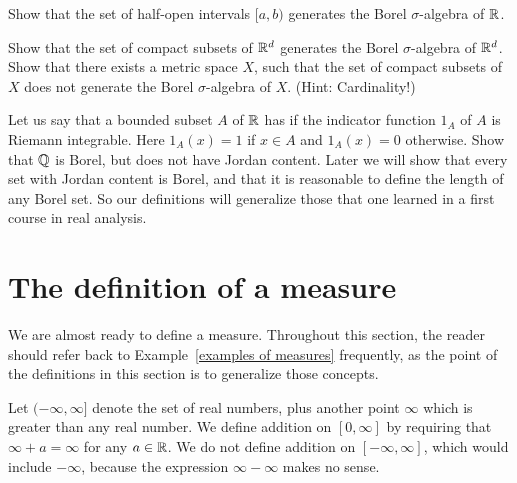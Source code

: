 \begin{exercise}\label{generators of Borel}
Show that the set of half-open intervals $[a, b)$ generates the Borel $\sigma$-algebra of $\mathbb{R}$.
\end{exercise}

\begin{exercise}
Show that the set of compact subsets of $\mathbb{R}^{d}$ generates the Borel $\sigma$-algebra of $\mathbb{R}^{d}$.
Show that there exists a metric space $X$, such that the set of compact subsets of $X$ does not generate the Borel $\sigma$-algebra of $X$. (Hint: Cardinality!)
\end{exercise}

\begin{exercise}\label{Jordan content 1}
Let us say that a bounded subset $A$ of $\mathbb{R}$ has  if the indicator function $1_{A}$ of $A$ is Riemann integrable.
Here $1_{A}(x) = 1$ if $x \in A$ and $1_{A}(x) = 0$ otherwise.
Show that $\mathbb{Q}$ is Borel, but does not have Jordan content.
Later we will show that every set with Jordan content is Borel, and that it is reasonable to define the length of any Borel set.
So our definitions will generalize those that one learned in a first course in real analysis.
\end{exercise}


\section{The definition of a measure}
We are almost ready to define a measure.
Throughout this section, the reader should refer back to Example~\ref{examples of measures} frequently, as the point of the definitions in this section is to generalize those concepts.

\begin{subsec}
Let $(-\infty, \infty]$ denote the set of real numbers, plus another point $\infty$ which is greater than any real number.
We define addition on $[0, \infty]$ by requiring that $\infty + a = \infty$ for any $a \in \mathbb{R}$.
We do not define addition on $[-\infty, \infty]$, which would include $-\infty$, because the expression $\infty - \infty$ makes no sense.
\end{subsec}


